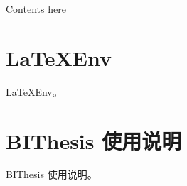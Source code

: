 %
%
%
%
%
%

\renewcommand{\thechapter}{Appendix}


Contents here


\section{\LaTeX Env}
\LaTeX Env。

\section{BIThesis 使用说明}
BIThesis 使用说明。

